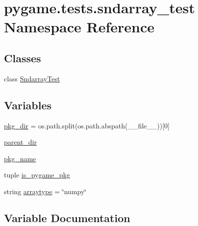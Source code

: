 \hypertarget{namespacepygame_1_1tests_1_1sndarray__test}{}\section{pygame.\+tests.\+sndarray\+\_\+test Namespace Reference}
\label{namespacepygame_1_1tests_1_1sndarray__test}
\subsection*{Classes}
\begin{DoxyCompactItemize}
\item 
class \hyperlink{classpygame_1_1tests_1_1sndarray__test_1_1_sndarray_test}{Sndarray\+Test}
\end{DoxyCompactItemize}
\subsection*{Variables}
\begin{DoxyCompactItemize}
\item 
\hyperlink{namespacepygame_1_1tests_1_1sndarray__test_aa0cfd1d502609f339f51fbedee5bd6b3}{pkg\+\_\+dir} = os.\+path.\+split(os.\+path.\+abspath(\+\_\+\+\_\+file\+\_\+\+\_\+))\mbox{[}0\mbox{]}
\item 
\hyperlink{namespacepygame_1_1tests_1_1sndarray__test_a7e8a241a5f2f7aa0ed9988188b9daa6a}{parent\+\_\+dir}
\item 
\hyperlink{namespacepygame_1_1tests_1_1sndarray__test_a35e7b7507113b1eebe4bdce8d336ecf5}{pkg\+\_\+name}
\item 
tuple \hyperlink{namespacepygame_1_1tests_1_1sndarray__test_a18e32d9549052ea2724787c0b673cf62}{is\+\_\+pygame\+\_\+pkg}
\item 
string \hyperlink{namespacepygame_1_1tests_1_1sndarray__test_a35e3cf279a2355f32a1e93520c018229}{arraytype} = \char`\"{}numpy\char`\"{}
\end{DoxyCompactItemize}


\subsection{Variable Documentation}
\mbox{\label{namespacepygame_1_1tests_1_1sndarray__test_a35e3cf279a2355f32a1e93520c018229}} 
